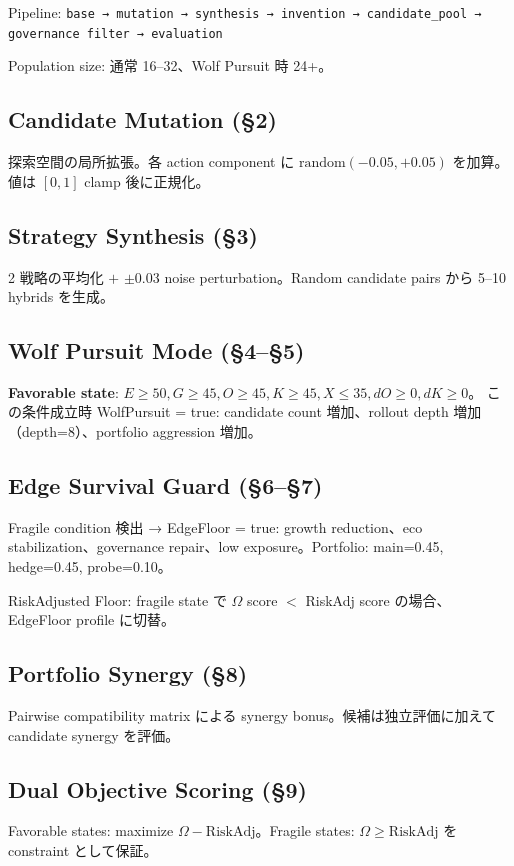 \documentclass[11pt,a4paper]{article}
\theoremstyle{definition}\newtheorem{definition}{Definition}[section]
\begin{document}
Pipeline: \texttt{base → mutation → synthesis → invention → candidate\_pool → governance filter → evaluation}

Population size: 通常 16--32、Wolf Pursuit 時 24+。

\subsection{Candidate Mutation (\S2)}
探索空間の局所拡張。各 action component に $\text{random}(-0.05, +0.05)$ を加算。値は $[0,1]$ clamp 後に正規化。

\subsection{Strategy Synthesis (\S3)}
2 戦略の平均化 $+$ $\pm 0.03$ noise perturbation。Random candidate pairs から 5--10 hybrids を生成。

\subsection{Wolf Pursuit Mode (\S4--\S5)}
\textbf{Favorable state}: $E \geq 50, G \geq 45, O \geq 45, K \geq 45, X \leq 35, dO \geq 0, dK \geq 0$。
この条件成立時 WolfPursuit = true: candidate count 増加、rollout depth 増加（depth=8）、portfolio aggression 増加。

\subsection{Edge Survival Guard (\S6--\S7)}
Fragile condition 検出 → EdgeFloor = true: growth reduction、eco stabilization、governance repair、low exposure。Portfolio: main=0.45, hedge=0.45, probe=0.10。

RiskAdjusted Floor: fragile state で $\Omega$ score $<$ RiskAdj score の場合、EdgeFloor profile に切替。

\subsection{Portfolio Synergy (\S8)}
Pairwise compatibility matrix による synergy bonus。候補は独立評価に加えて candidate synergy を評価。

\subsection{Dual Objective Scoring (\S9)}
Favorable states: maximize $\Omega - \text{RiskAdj}$。Fragile states: $\Omega \geq \text{RiskAdj}$ を constraint として保証。
\end{document}
